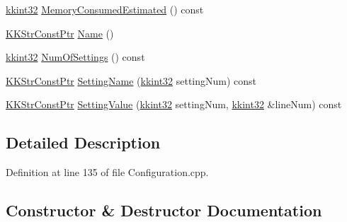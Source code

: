 \begin{DoxyCompactItemize}
\item 
\hyperlink{namespace_k_k_b_a8fa4952cc84fda1de4bec1fbdd8d5b1b}{kkint32} \hyperlink{class_k_k_b_1_1_configuration_1_1_conf_section_afe69828f2a0c656b5fccbc505bf5b76d}{Memory\+Consumed\+Estimated} () const 
\item 
\hyperlink{namespace_k_k_b_a46f665ec17615c856eff3d21f78bed5c}{K\+K\+Str\+Const\+Ptr} \hyperlink{class_k_k_b_1_1_configuration_1_1_conf_section_a424429308d68bbbd92b202388dd84199}{Name} ()
\item 
\hyperlink{namespace_k_k_b_a8fa4952cc84fda1de4bec1fbdd8d5b1b}{kkint32} \hyperlink{class_k_k_b_1_1_configuration_1_1_conf_section_a78b411589b1131004fa95b91c51e4ccd}{Num\+Of\+Settings} () const 
\item 
\hyperlink{namespace_k_k_b_a46f665ec17615c856eff3d21f78bed5c}{K\+K\+Str\+Const\+Ptr} \hyperlink{class_k_k_b_1_1_configuration_1_1_conf_section_a3d32ef2ed347cd5c5eb56da698faedec}{Setting\+Name} (\hyperlink{namespace_k_k_b_a8fa4952cc84fda1de4bec1fbdd8d5b1b}{kkint32} setting\+Num) const 
\item 
\hyperlink{namespace_k_k_b_a46f665ec17615c856eff3d21f78bed5c}{K\+K\+Str\+Const\+Ptr} \hyperlink{class_k_k_b_1_1_configuration_1_1_conf_section_a964fc3110515c19a36c1f54270235a1c}{Setting\+Value} (\hyperlink{namespace_k_k_b_a8fa4952cc84fda1de4bec1fbdd8d5b1b}{kkint32} setting\+Num, \hyperlink{namespace_k_k_b_a8fa4952cc84fda1de4bec1fbdd8d5b1b}{kkint32} \&line\+Num) const 
\end{DoxyCompactItemize}


\subsection{Detailed Description}


Definition at line 135 of file Configuration.\+cpp.



\subsection{Constructor \& Destructor Documentation}
